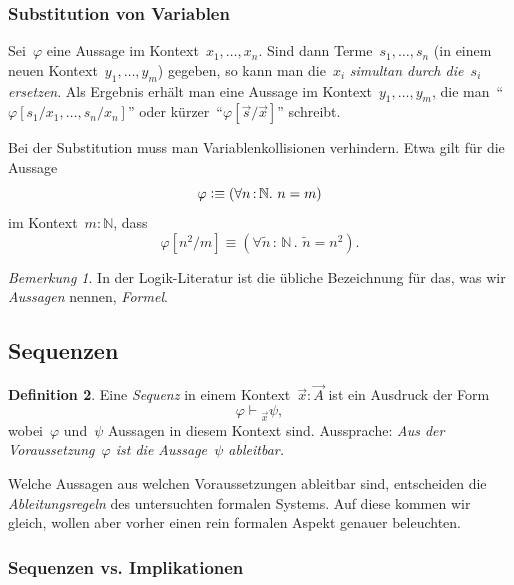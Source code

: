 \documentclass[a4paper,ngerman,12pt]{scrartcl}
\theoremstyle{definition}
\newtheorem{defn}{Definition}[section]
\theoremstyle{plain}
\theoremstyle{remark}
\newtheorem{bem}[defn]{Bemerkung}
\newcommand{\NN}{\mathbb{N}}
\newcommand{\seq}[1]{\mathrel{\vdash\!\!\!_{#1}}}
\renewcommand{\_}{\mathpunct{.}\,}
\newcommand{\?}{\,{:}\,}
\newcommand{\defequiv}{\vcentcolon\equiv}
\begin{document}
\subsubsection*{Substitution von Variablen}

Sei~$\varphi$ eine Aussage im Kontext~$x_1,\ldots,x_n$. Sind dann
Terme~$s_1,\ldots,s_n$ (in einem neuen Kontext~$y_1,\ldots,y_m$) gegeben, so
kann man die~$x_i$ \emph{simultan durch die~$s_i$ ersetzen}. Als Ergebnis
erhält man eine Aussage im Kontext~$y_1,\ldots,y_m$, die
man~"`$\varphi[s_1/x_1,\ldots,s_n/x_n]$"' oder kürzer~"`$\varphi[\vec s/\vec
x]$"' schreibt.

Bei der Substitution muss man Variablenkollisionen verhindern. Etwa gilt für
die Aussage
\[ \varphi \defequiv (\forall n\?\NN\_ n = m) \]
im Kontext~$m : \NN$, dass
\[ \varphi[n^2/m] \equiv (\forall \tilde n\?\NN\_ \tilde n = n^2). \]

\begin{bem}In der Logik-Literatur ist die übliche Bezeichnung für das, was wir \emph{Aussagen}
nennen, \emph{Formel}.\end{bem}


\subsection{Sequenzen}

\begin{defn}Eine \emph{Sequenz} in einem Kontext~$\vec x : \vec A$ ist ein
Ausdruck der Form
\[ \varphi \seq{\vec x} \psi, \]
wobei~$\varphi$ und~$\psi$ Aussagen in diesem Kontext sind. Aussprache:
\emph{Aus der Voraussetzung~$\varphi$ ist die Aussage~$\psi$ ableitbar.}
\end{defn}

Welche Aussagen aus welchen Voraussetzungen ableitbar sind, entscheiden die
\emph{Ableitungsregeln} des untersuchten formalen Systems. Auf diese kommen wir
gleich, wollen aber vorher einen rein formalen Aspekt genauer beleuchten.


\subsubsection*{Sequenzen vs. Implikationen}
\end{document}
